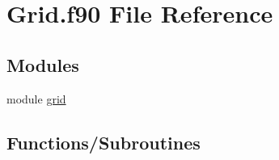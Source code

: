 \hypertarget{Grid_8f90}{}\section{Grid.\+f90 File Reference}
\label{Grid_8f90}
\subsection*{Modules}
\begin{DoxyCompactItemize}
\item 
module \hyperlink{namespacegrid}{grid}
\end{DoxyCompactItemize}
\subsection*{Functions/\+Subroutines}
